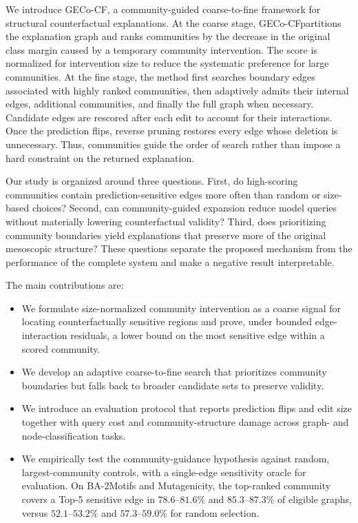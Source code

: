 \documentclass[runningheads]{llncs}
\newcommand{\method}{GECo-CF}
\begin{document}
We introduce \method, a community-guided coarse-to-fine framework for
structural counterfactual explanations. At the coarse stage, \method partitions
the explanation graph and ranks communities by the decrease in the original
class margin caused by a temporary community intervention. The score is
normalized for intervention size to reduce the systematic preference for
large communities. At the fine stage, the method first searches boundary edges
associated with highly ranked communities, then adaptively admits their
internal edges, additional communities, and finally the full graph when
necessary. Candidate edges are rescored after each edit to account for their
interactions. Once the prediction flips, reverse pruning restores every edge
whose deletion is unnecessary. Thus, communities guide the order of search
rather than impose a hard constraint on the returned explanation.

Our study is organized around three questions. First, do high-scoring
communities contain prediction-sensitive edges more often than random or
size-based choices? Second, can community-guided expansion reduce model queries
without materially lowering counterfactual validity? Third, does prioritizing
community boundaries yield explanations that preserve more of the original
mesoscopic structure? These questions separate the proposed mechanism from
the performance of the complete system and make a negative result
interpretable.

The main contributions are:
\begin{itemize}
  \item We formulate size-normalized community intervention as a coarse signal
  for locating counterfactually sensitive regions and prove, under bounded
  edge-interaction residuals, a lower bound on the most sensitive edge within
  a scored community.
  \item We develop an adaptive coarse-to-fine search that prioritizes community
  boundaries but falls back to broader candidate sets to preserve validity.
  \item We introduce an evaluation protocol that reports prediction flips and
  edit size together with query cost and community-structure damage across
  graph- and node-classification tasks.
  \item We empirically test the community-guidance hypothesis against random,
  largest-community controls, with a single-edge sensitivity oracle for
  evaluation. On BA-2Motifs and
  Mutagenicity, the top-ranked community covers a Top-5 sensitive edge in
  $78.6$--$81.6\%$ and $85.3$--$87.3\%$ of eligible graphs, versus
  $52.1$--$53.2\%$ and $57.3$--$59.0\%$ for random selection.
\end{itemize}
\end{document}
